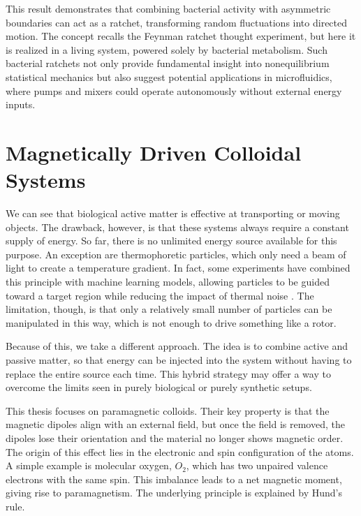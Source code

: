 This result demonstrates that combining bacterial activity with asymmetric boundaries can act as a ratchet, transforming random fluctuations into directed motion. The concept recalls the Feynman ratchet thought experiment, but here it is realized in a living system, powered solely by bacterial metabolism. Such bacterial ratchets not only provide fundamental insight into nonequilibrium statistical mechanics but also suggest potential applications in microfluidics, where pumps and mixers could operate autonomously without external energy inputs.

\chapter{Magnetically Driven Colloidal Systems}
\label{magneticallydrivencolloidalsystems}


We can see that biological active matter is effective at transporting or moving objects. The drawback, however, is that these systems always require a constant supply of energy. So far, there is no unlimited energy source available for this purpose. An exception are thermophoretic particles, which only need a beam of light to create a temperature gradient. In fact, some experiments have combined this principle with machine learning models, allowing particles to be guided toward a target region while reducing the impact of thermal noise \cite{muinos2021reinforcement}. The limitation, though, is that only a relatively small number of particles can be manipulated in this way, which is not enough to drive something like a rotor.

Because of this, we take a different approach. The idea is to combine active and passive matter, so that energy can be injected into the system without having to replace the entire source each time. This hybrid strategy may offer a way to overcome the limits seen in purely biological or purely synthetic setups.

This thesis focuses on paramagnetic colloids. Their key property is that the magnetic dipoles align with an external field, but once the field is removed, the dipoles lose their orientation and the material no longer shows magnetic order. The origin of this effect lies in the electronic and spin configuration of the atoms. A simple example is molecular oxygen, $O_2$, which has two unpaired valence electrons with the same spin. This imbalance leads to a net magnetic moment, giving rise to paramagnetism. The underlying principle is explained by Hund’s rule.

